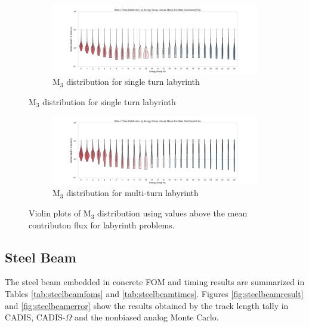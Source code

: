 \begin{figure}[htb!]
  \centering
  \begin{subfigure}[t]{\textwidth}
    \includegraphics[width=\linewidth]{./chapters/characterization_probs/figures/char/maze2/metric_three_violin_mean.pdf}
    \caption{M$_{3}$ distribution for single turn labyrinth}
    \label{fig:maze2M3violins}
  \end{subfigure}
\end{figure}
\begin{figure}[htb!]\ContinuedFloat
  \centering
  \begin{subfigure}[t]{\textwidth}
    \includegraphics[width=\linewidth]{./chapters/characterization_probs/figures/char/maze1/metric_three_violin_mean.pdf}
    \caption{M$_3$ distribution for multi-turn labyrinth}
    \label{fig:maze1M3violins}
  \end{subfigure}
  \caption[Violin plots of M$_{3}$ distribution using values above the mean
  contributon flux for labyrinth problems.]
  {Violin plots of M$_{3}$ distribution using values above the mean
  contributon flux for labyrinth problems.}
  \label{fig:labyrinthviolins}
\end{figure}


\subsection{Steel Beam}
\label{subsec:resultbeam}

The steel beam embedded in concrete FOM and timing
results are summarized in Tables
\ref{tab:steelbeamfoms} and \ref{tab:steelbeamtimes}. Figures
\ref{fig:steelbeamresult} and \ref{fig:steelbeamerror} show the results obtained
by the track length tally in CADIS, CADIS-$\Omega$ and the nonbiased analog
Monte Carlo.

